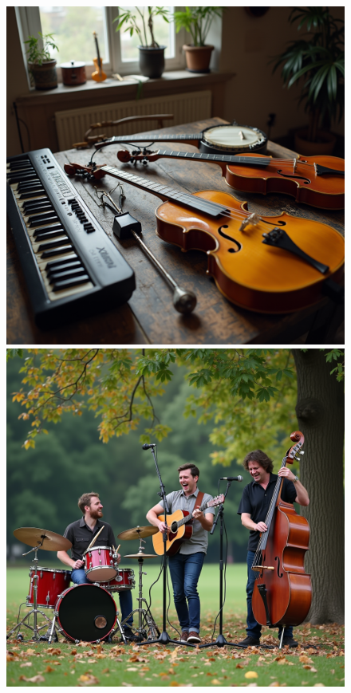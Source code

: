 \begin{figure}
    \begin{minipage}{0.24\textwidth}
        \centering
        \includegraphics[width=\textwidth]{bilder/synth_0_2.5_4.png}
    \end{minipage}
    \begin{minipage}{0.24\textwidth}
        \centering
        \includegraphics[width=\textwidth]{bilder/synth_2_3.5_9.png}

\end{minipage}
\end{figure}
